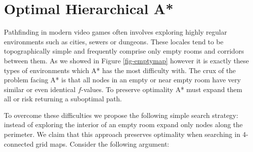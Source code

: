 \section{Optimal Hierarchical A*}
Pathfinding in modern video games often involves exploring highly regular 
\label{algorithm}
environments such as cities, sewers or dungeons.
These locales tend to be topographically simple and frequently comprise only
empty rooms and corridors between them.
As we showed in Figure \ref{fig-emptymap} however it is exactly these 
types of environments which A* has the most difficulty with.
The crux of the problem facing A* is that all nodes in an empty or near 
empty room have very similar or even identical $f$-values.
To preserve optimality A* must expand them all or risk returning a suboptimal path.
\par
To overcome these difficulties we propose the following simple search strategy:
instead of exploring the interior of an empty room expand only nodes along the
perimeter. We claim that this approach preserves optimality when searching in 
4-connected grid maps. 
Consider the following argument:

